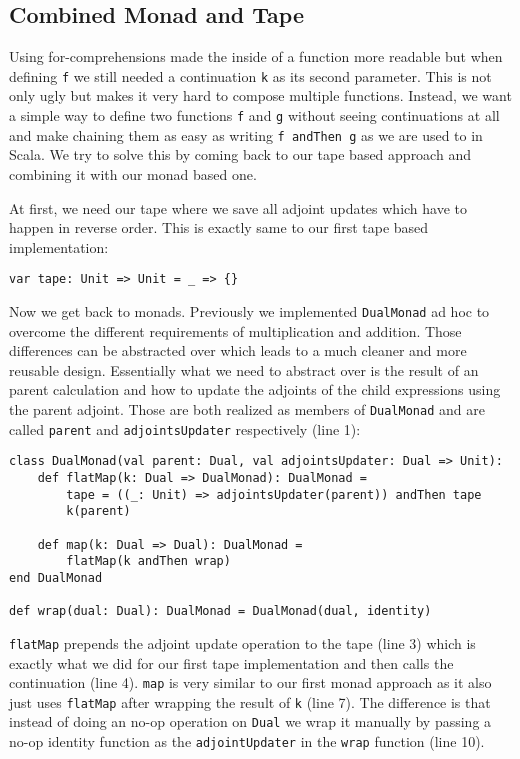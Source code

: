 \subsection{Combined Monad and Tape} \label{sec:monadAndTape}

Using for-comprehensions made the inside of a function more readable but when defining \lstinline{f} we still needed a continuation \lstinline{k} as its second parameter. This is not only ugly but makes it very hard to compose multiple functions. Instead, we want a simple way to define two functions \lstinline{f} and \lstinline{g} without seeing continuations at all and make chaining them as easy as writing \lstinline{f andThen g} as we are used to in Scala. We try to solve this by coming back to our tape based approach and combining it with our monad based one.

At first, we need our tape where we save all adjoint updates which have to happen in reverse order. This is exactly same to our first tape based implementation:
\begin{lstlisting}
var tape: Unit => Unit = _ => {}
\end{lstlisting}

Now we get back to monads. Previously we implemented \lstinline{DualMonad} ad hoc to overcome the different requirements of multiplication and addition. Those differences can be abstracted over which leads to a much cleaner and more reusable design. Essentially what we need to abstract over is the result of an parent calculation and how to update the adjoints of the child expressions using the parent adjoint. Those are both realized as members of \lstinline{DualMonad} and are called \lstinline{parent} and \lstinline{adjointsUpdater} respectively (line 1):
\begin{lstlisting}[caption={Monad using tape}, label={lst:monadTape}]
class DualMonad(val parent: Dual, val adjointsUpdater: Dual => Unit):
    def flatMap(k: Dual => DualMonad): DualMonad =
        tape = ((_: Unit) => adjointsUpdater(parent)) andThen tape
        k(parent)

    def map(k: Dual => Dual): DualMonad =
        flatMap(k andThen wrap)
end DualMonad

def wrap(dual: Dual): DualMonad = DualMonad(dual, identity)
\end{lstlisting}
\lstinline{flatMap} prepends the adjoint update operation to the tape (line 3) which is exactly what we did for our first tape implementation and then calls the continuation (line 4). \lstinline{map} is very similar to our first monad approach as it also just uses \lstinline{flatMap} after wrapping the result of \lstinline{k} (line 7). The difference is that instead of doing an no-op operation on \lstinline{Dual} we wrap it manually by passing a no-op identity function as the \lstinline{adjointUpdater} in the \lstinline{wrap} function (line 10).

